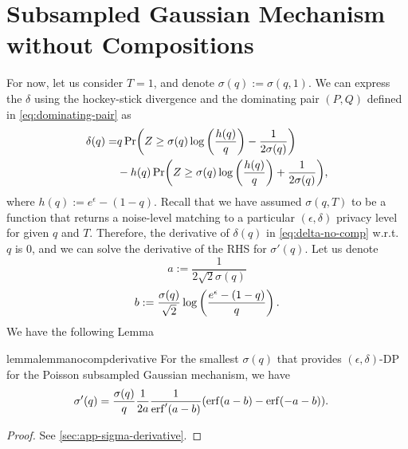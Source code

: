 \documentclass{article}
\theoremstyle{plain}
\theoremstyle{definition}
\theoremstyle{remark}
\begin{document}
\section{Subsampled Gaussian Mechanism without Compositions}
\label{sec:no-comp}
For now, let us consider $T=1$, and denote $\sigma(q) := \sigma(q, 1)$. 
We can express the $\delta$ using the hockey-stick divergence 
and the dominating pair $(P, Q)$ defined in \cref{eq:dominating-pair}
as 
\begin{equation}
    \label{eq:delta-no-comp}
    \begin{split}
        \delta(q) = &q\Pr (Z  \geq \sigma(q) \log \left( \frac{h(q)}{q} \right) - \frac{1}{2\sigma(q)}) \\
           &-h(q) \Pr(Z  \geq \sigma(q) \log \left( \frac{h(q)}{q} \right) + \frac{1}{2\sigma(q)}),
    \end{split}
\end{equation}
where $h(q) := e^\epsilon - (1-q)$. Recall that
we have assumed $\sigma(q, T)$ to be a function that returns a noise-level
matching to a particular $(\epsilon,\delta)$ privacy level for given $q$ and $T$. 
Therefore, the derivative of $\delta(q)$ in \cref{eq:delta-no-comp} w.r.t.\ 
$q$ is $0$, and we can solve the derivative of the RHS for $\sigma'(q)$.
Let us denote 
\begin{equation}
    \label{eq:def-a}
    a := \frac{1}{2\sqrt{2} \sigma(q)}
\end{equation}
\begin{equation}
    \label{eq:def-b}
    b := \frac{\sigma(q)}{\sqrt{2}} \log \left( \frac{e^\epsilon - (1-q)}{q} \right).
\end{equation}
We have the following Lemma
\begin{restatable}{lemma}{lemmanocompderivative}
    \label{lemma:no-comp-derivative}
    For the smallest $\sigma(q)$ that provides $(\epsilon, \delta)$-DP for the Poisson subsampled
    Gaussian mechanism, we have
    \begin{align}
        \label{eq:sigma-no-comp-der}
        \sigma'(q) 
            &= \frac{\sigma(q)}{q} \frac{1}{2 a} \frac{1}{\erf'(a-b)} (\erf(a-b) - \erf(-a-b)).
    \end{align}
\end{restatable}
\begin{proof}    
    See \cref{sec:app-sigma-derivative}.
\end{proof}
\end{document}
